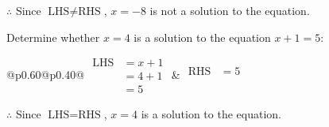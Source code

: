 \documentclass[12pt]{article}
\newcounter{minipagecount}
\begin{document}
\begin{multicols}{2}
\begin{minipage}[t]{0.40\textwidth}
    \noindent \(\therefore\) Since \(\text{LHS} \neq \text{RHS}\), \(x = -8\) is not  a solution to the equation.

\end{minipage}

\vspace*{0.5ex}
\vfill{}
\noindent{(\theminipagecount)}\hspace{0.1mm} %
\begin{minipage}[t]{0.40\textwidth} %

    \noindent Determine whether \(x = 4\) is a solution to the equation \(x + 1 = 5\):
    \vspace{2pt}  %

    \noindent
    \renewcommand{\arraystretch}{1.3} %
    \begin{tabular}{@{}p{0.60\linewidth}@{}p{0.40\linewidth}@{}}
        \(\begin{aligned}
            \text{LHS} &= x + 1 \\
                    &= 4 + 1 \\
                    &= 5 
        \end{aligned}\) &
        \(\begin{aligned}
            \text{RHS} &= 5\\
                    & \\
                    &
        \end{aligned}\)
    \end{tabular}
    \renewcommand{\arraystretch}{1.0} %
    \vspace{2pt}  %

    \noindent \(\therefore\) Since \(\text{LHS} = \text{RHS}\), \(x = 4\) is  a solution to the equation.

\end{minipage}

\vspace*{0.5ex}
\vfill{}
\noindent{(\theminipagecount)}\hspace{0.1mm} %
\begin{minipage}[t]{0.40\textwidth} %


\end{minipage}
\end{multicols}
\end{document}
